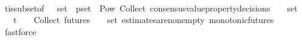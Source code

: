 \begin{isabellebody}
\ \ \ \ \isamarkupfalse%
\ {\isasymSigma}t{\isacharunderscore}is{\isacharunderscore}subset{\isacharunderscore}of{\isacharunderscore}{\isasymSigma}\ {\isacartoucheopen}{\isasymsigma}\ {\isasymin}\ {\isasymsigma}{\isacharunderscore}set\ {\isasymand}\ p{\isacharunderscore}set\ {\isasymin}\ Pow\ {\isacharparenleft}{\isasymUnion}{\isacharunderscore}Collect\ {\isacharparenleft}consensus{\isacharunderscore}value{\isacharunderscore}property{\isacharunderscore}decisions\ {\isasymsigma}{\isacharprime}{\isacharparenright}\ {\isacharparenleft}{\isasymsigma}{\isacharprime}\ {\isasymin}\ {\isasymsigma}{\isacharunderscore}set{\isacharparenright}{\isacharparenright}\ {\isacharminus}\ {\isasymemptyset}{\isacartoucheclose}\ {\isacartoucheopen}{\isasymsigma}{\isacharprime}\ {\isasymin}\ {\isasymSigma}t\ {\isasymand}\ {\isasymsigma}{\isacharprime}\ {\isasymin}\ {\isasymInter}{\isacharunderscore}Collect\ {\isacharparenleft}futures\ {\isasymsigma}{\isacharparenright}\ {\isacharparenleft}{\isasymsigma}\ {\isasymin}\ {\isasymsigma}{\isacharunderscore}set{\isacharparenright}{\isacartoucheclose}\ estimates{\isacharunderscore}are{\isacharunderscore}non{\isacharunderscore}empty\ monotonic{\isacharunderscore}futures\ \isamarkupfalse%
\ fastforce\isanewline
{}\isamarkupfalse%
%
\endisatagproof
{\isafoldproof}%
%
\isadelimproof
\isanewline
%
\endisadelimproof
%
\isadelimtheory
\isanewline
%
\endisadelimtheory
%
\isatagtheory
{}\isamarkupfalse%
%
\endisatagtheory
{\isafoldtheory}%
%
\isadelimtheory
%
\endisadelimtheory
%
\end{isabellebody}%
\endinput

